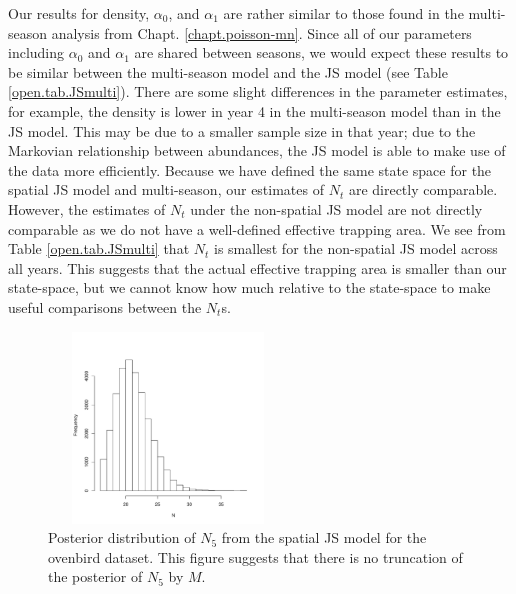 Our results for density, $\alpha_0$, and $\alpha_1$ are rather similar
to those found in the multi-season analysis from
Chapt. \ref{chapt.poisson-mn}.  Since all of our parameters including
$\alpha_0$ and $\alpha_1$ are shared between seasons, we would expect
these results to be similar between the multi-season model and the JS
model (see Table \ref{open.tab.JSmulti}).  There are some slight
differences in the parameter estimates, for example, the density is
lower in year 4 in the multi-season model than in the JS model.  This
may be due to a smaller sample size in that year; due to the Markovian
relationship between abundances, the JS model is able to make use of
the data more efficiently.  Because we have defined the same state
space for the spatial JS model and multi-season, our estimates of
$N_t$ are directly comparable.  However, the estimates of $N_t$ under
the non-spatial JS model are not directly comparable as we do not have
a well-defined effective trapping area.  We see from Table
\ref{open.tab.JSmulti} that $N_t$ is smallest for the non-spatial JS
model across all years.  This suggests that the actual effective
trapping area is smaller than our state-space, but we cannot know how
much relative to the state-space to make useful comparisons between
the $N_t$s.

\begin{figure}
\centering
\includegraphics[height=2in,width=2.5in]{Ch16-Open/figs/Nhat5ovenbird.pdf}
\caption{Posterior distribution of $N_5$ from the spatial JS model for
  the ovenbird dataset.  This figure
suggests that there is no truncation of the posterior of $N_5$ by $M$. }
\label{open.figs.ovenbirdN5hist}
\end{figure}


